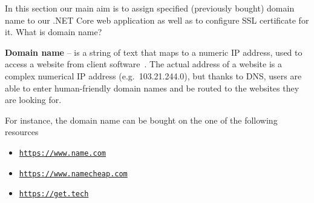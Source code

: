 In this section our main aim is to assign specified (previously bought) domain name to our .NET Core web application
as well as to configure SSL certificate for it.
What is domain name?
\begin{center}
    \textbf{Domain name} -- is a string of text that maps to a numeric IP address, used to access a website
    from client software~\cite{DomanNameCloudflare}.
    The actual address of a website is a complex numerical IP address (e.g.\ 103.21.244.0), but thanks to DNS,
    users are able to enter human-friendly domain names and be routed to the websites they are looking for.
\end{center}
For instance, the domain name can be bought on the one of the following resources
\begin{itemize}
    \item \href{https://www.name.com/}{\texttt{https://www.name.com}}
    \item \href{https://www.namecheap.com/}{\texttt{https://www.namecheap.com}}
    \item \href{https://get.tech/}{\texttt{https://get.tech}}
\end{itemize}